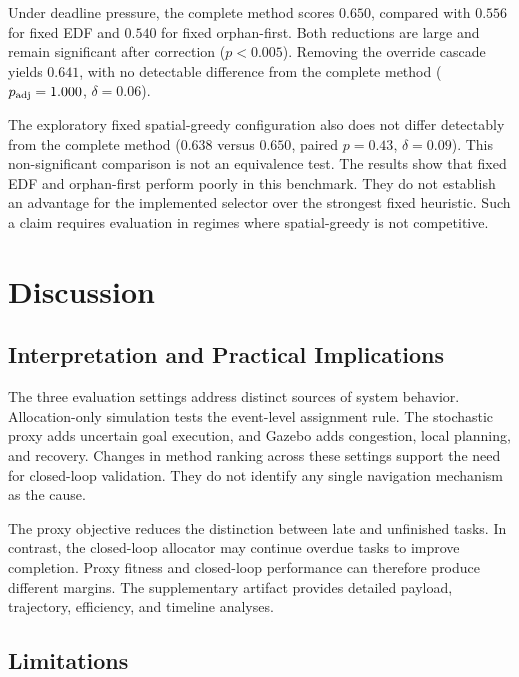 \documentclass[10pt,letterpaper,onecolumn]{IEEEtran}
\begin{document}


Under deadline pressure, the complete method scores $0.650$, compared with
$0.556$ for fixed EDF and $0.540$ for fixed orphan-first. Both reductions are
large and remain significant after correction ($p<0.005$). Removing the
override cascade yields $0.641$, with no detectable difference from the
complete method ($p_{\rm adj}=1.000$, $\delta=0.06$).

The exploratory fixed spatial-greedy configuration also does not differ
detectably from the complete method ($0.638$ versus $0.650$, paired $p=0.43$,
$\delta=0.09$). This non-significant comparison is not an equivalence test.
The results show that fixed EDF and orphan-first perform poorly in this
benchmark. They do not establish an advantage for the implemented selector
over the strongest fixed heuristic. Such a claim requires evaluation in
regimes where spatial-greedy is not competitive.

\section{Discussion}
\label{sec:discussion}

\subsection{Interpretation and Practical Implications}

The three evaluation settings address distinct sources of system behavior.
Allocation-only simulation tests the event-level assignment rule. The
stochastic proxy adds uncertain goal execution, and Gazebo adds congestion,
local planning, and recovery. Changes in method ranking across these settings
support the need for closed-loop validation. They do not identify any single
navigation mechanism as the cause.

The proxy objective reduces the distinction between late and unfinished tasks.
In contrast, the closed-loop allocator may continue overdue tasks to improve
completion. Proxy fitness and closed-loop performance can therefore produce
different margins. The supplementary artifact provides detailed payload,
trajectory, efficiency, and timeline analyses.

\subsection{Limitations}
\label{sec:limitations}
\end{document}
